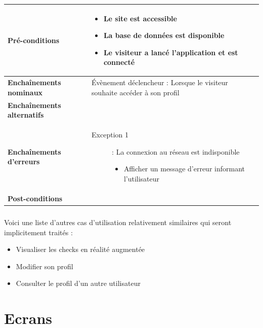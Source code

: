 \documentclass[a4paper,12pt]{report}
\begin{document}
\begin{onehalfspace}
\begin{tabular}{|p{3cm}|p{}|}
\textbf{Pré-conditions} &
    \begin{itemize}
      \item Le site est accessible
      \item La base de données est disponible
      \item Le visiteur a lancé l'application et est connecté
    \end{itemize}
\\ \hline %

\textbf{Enchaînements nominaux} &
  Évènement déclencheur : Lorsque le visiteur souhaite accéder à son profil
\\ \hline %

\textbf{Enchaînements alternatifs} &
\\ \hline %

\textbf{Enchaînements d'erreurs} &
  \begin{description}
    \item[Exception 1]: La connexion au réseau est indisponible
    \begin{itemize}
      \item Afficher un message d’erreur informant l'utilisateur
    \end{itemize}
  \end{description}
\\ \hline %

\textbf{Post-conditions} &
\\ \hline %

\end{tabular}

\paragraph*{}
Voici une liste d'autres cas d'utilisation relativement similaires qui seront implicitement traités :
\begin{itemize}
  \item Visualiser les checks en réalité augmentée
  \item Modifier son profil
  \item Consulter le profil d'un autre utilisateur
\end{itemize}

\chapter{Ecrans} %
\label{cha:ecrans_suppl_mentaires}
\begin{center}


\end{center}
\end{onehalfspace}
\end{document}

